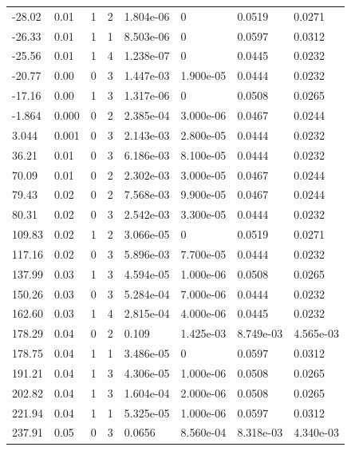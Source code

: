 \documentclass[preview]{standalone}
\begin{document}
{{\begin{tabular}{L{1.2cm}C{1.2cm} C{0.3cm}C{0.5cm} C{1.4cm}C{1.4cm} C{1.4cm}C{1.4cm}}
  -28.02  &  0.01  & 1     &  2 &  1.804e-06  & 0  & 0.0519 &  0.0271   \\ 
  -26.33  &  0.01  & 1     &  1 &  8.503e-06  & 0  & 0.0597 &  0.0312   \\ 
  -25.56  &  0.01  & 1     &  4 &  1.238e-07  & 0  & 0.0445 &  0.0232   \\ 
  -20.77  &  0.00  & 0     &  3 &  1.447e-03  & 1.900e-05  & 0.0444 &  0.0232   \\ 
  -17.16  &  0.00  & 1     &  3 &  1.317e-06  & 0  & 0.0508 &  0.0265   \\ 
  -1.864  &  0.000  & 0     &  2 &  2.385e-04  & 3.000e-06  & 0.0467 &  0.0244   \\ 
  3.044  &  0.001  & 0     &  3 &  2.143e-03  & 2.800e-05  & 0.0444 &  0.0232   \\ 
  36.21  &  0.01  & 0     &  3 &  6.186e-03  & 8.100e-05  & 0.0444 &  0.0232   \\ 
  70.09  &  0.01  & 0     &  2 &  2.302e-03  & 3.000e-05  & 0.0467 &  0.0244   \\ 
  79.43  &  0.02  & 0     &  2 &  7.568e-03  & 9.900e-05  & 0.0467 &  0.0244   \\ 
  80.31  &  0.02  & 0     &  3 &  2.542e-03  & 3.300e-05  & 0.0444 &  0.0232   \\ 
  109.83  &  0.02  & 1     &  2 &  3.066e-05  & 0  & 0.0519 &  0.0271   \\ 
  117.16  &  0.02  & 0     &  3 &  5.896e-03  & 7.700e-05  & 0.0444 &  0.0232   \\ 
  137.99  &  0.03  & 1     &  3 &  4.594e-05  & 1.000e-06  & 0.0508 &  0.0265   \\ 
  150.26  &  0.03  & 0     &  3 &  5.284e-04  & 7.000e-06  & 0.0444 &  0.0232   \\ 
  162.60  &  0.03  & 1     &  4 &  2.815e-04  & 4.000e-06  & 0.0445 &  0.0232   \\ 
  178.29  &  0.04  & 0     &  2 &  0.109  & 1.425e-03  & 8.749e-03 &  4.565e-03   \\ 
  178.75  &  0.04  & 1     &  1 &  3.486e-05  & 0  & 0.0597 &  0.0312   \\ 
  191.21  &  0.04  & 1     &  3 &  4.306e-05  & 1.000e-06  & 0.0508 &  0.0265   \\ 
  202.82  &  0.04  & 1     &  3 &  1.604e-04  & 2.000e-06  & 0.0508 &  0.0265   \\ 
  221.94  &  0.04  & 1     &  1 &  5.325e-05  & 1.000e-06  & 0.0597 &  0.0312   \\ 
  237.91  &  0.05  & 0     &  3 &  0.0656  & 8.560e-04  & 8.318e-03 &  4.340e-03   \\ 

\end{tabular}}}
\end{document}

